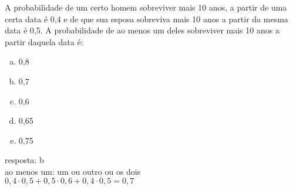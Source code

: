 \begin{ex}
 A probabilidade de um certo homem sobreviver mais 10 anos, a partir de uma certa data é 0,4 e de que sua esposa sobreviva mais 10 anos a partir da mesma data é 0,5. A probabilidade de  ao menos  um deles sobreviver mais 10 anos a partir daquela data é:
    \begin{enumerate}[(a)]
    \item 0,8
    \item 0,7
    \item 0,6
    \item 0,65
    \item 0,75
    \end{enumerate}
      \begin{sol}
      resposta: b \\
      ao menos um: um ou outro ou os dois \\
      $0,4\cdot0,5+0,5\cdot0,6+0,4\cdot0,5=0,7$
      \end{sol}
\end{ex}